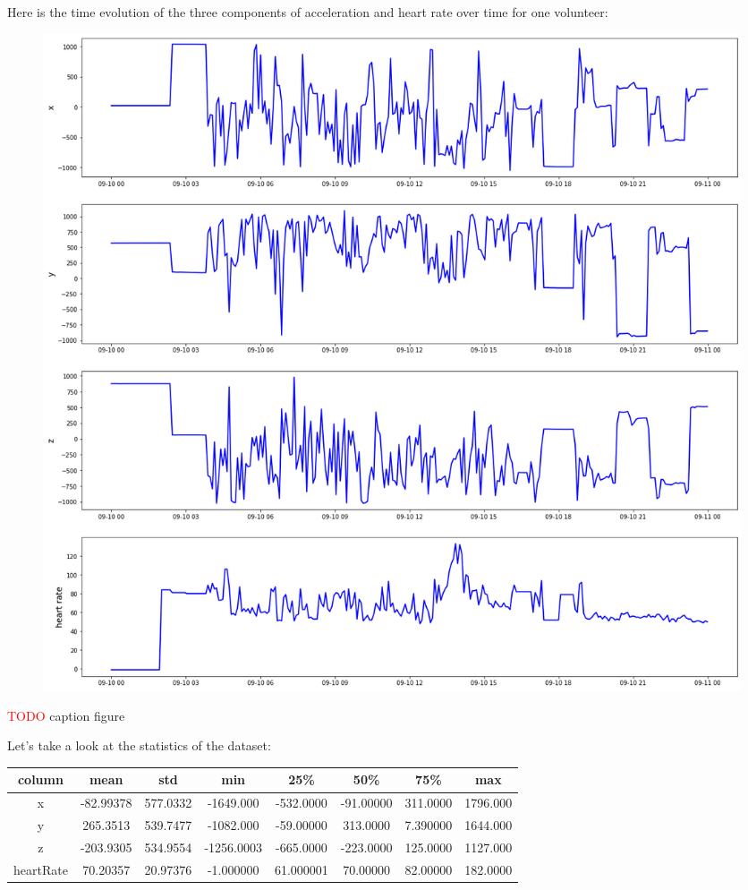 Here is the time evolution of the three components of acceleration and heart rate over time for one volunteer:

\begin{figure}[H]
\centering
  \includegraphics[scale=0.3]{img/task_2/data(5min).png}
  \caption{}
  \label{fig: }
\end{figure}

\textcolor{red}{TODO} caption figure

Let's take a look at the statistics of the dataset:

\begin{center}
\begin{tabular}{| c | c | c | c | c | c | c | c |} 
\hline
column & mean & std & min & 25\% & 50\% & 75\% & max \\ [0.5ex] 
\hline
\hline
x  &	-82.99378 & 577.0332 & -1649.000  & -532.0000 & -91.00000 & 311.0000 & 1796.000 \\
\hline
y  &	265.3513 & 539.7477 & -1082.000 & -59.00000 & 313.0000 & 7.390000 & 1644.000 \\
\hline
z  &	-203.9305 & 534.9554 & -1256.0003  & -665.0000 & -223.0000  & 125.0000 & 1127.000 \\
\hline
heartRate & 70.20357 & 20.97376 & -1.000000 & 61.000001 & 70.00000 & 82.00000 & 182.0000 \\ [1ex]
\hline
\end{tabular}
\end{center}

